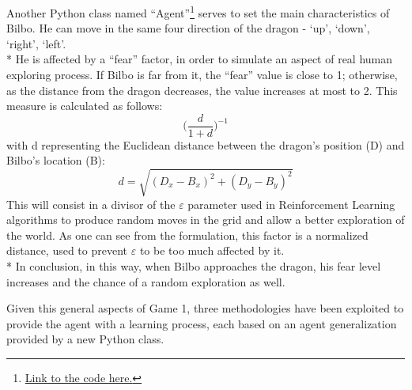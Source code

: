 Another Python class named ``Agent''\footnote{\href{https://github.com/moiraghif/DragonHunting/blob/master/Bilbo\%20World/agents.py}{Link to the code here.}} serves to set the main characteristics of Bilbo.
He can move in the same four direction of the dragon - `up', `down', `right', `left'. \\*
He is affected by a ``fear'' factor, in order to simulate an aspect of real human exploring process. If Bilbo is far from it, the ``fear'' value is close to 1; otherwise, as the distance from the dragon decreases, the value increases at most to 2. This measure is calculated as follows: 
$$\Big(\frac{d}{1+d}\Big)^{-1}$$
with d representing the Euclidean distance between the dragon's position (D) and Bilbo's location (B):
$$d=\sqrt{(D_{x}-B_{x})^2+(D_{y}-B_{y})^2}$$
This will consist in a divisor of the $\varepsilon$ parameter used in Reinforcement Learning algorithms to produce random moves in the grid and allow a better exploration of the world. As one can see from the formulation, this factor is a normalized distance, used to prevent $\varepsilon$ to be too much affected by it.\\*
In conclusion, in this way, when Bilbo approaches the dragon, his fear level increases and the chance of a random exploration as well.

Given this general aspects of Game 1, three methodologies have been exploited to provide the agent with a learning process, each based on an agent generalization provided by a new Python class.

